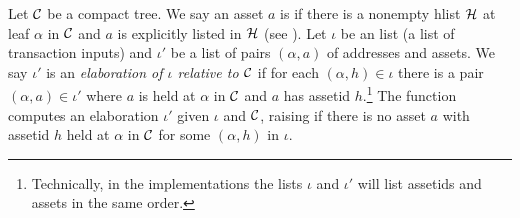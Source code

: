 Let $\mathcal{C}$ be a compact tree.
We say an asset $a$ is {}
if there is a nonempty hlist $\mathcal{H}$ at leaf $\alpha$ in $\mathcal{C}$ and $a$
is explicitly listed in $\mathcal{H}$ (see {}).
Let $\iota$ be an {} list (a list of transaction inputs)
and $\iota'$ be a list of pairs $(\alpha,a)$ of addresses and assets.
We say $\iota'$ is an {\emph{elaboration of $\iota$ relative to $\mathcal{C}$}}
if for each $(\alpha,h) \in\iota$ there is a pair $(\alpha,a) \in\iota'$
where $a$ is held at $\alpha$ in $\mathcal{C}$ and $a$ has assetid $h$.\footnote{Technically, in the implementations the lists $\iota$ and $\iota'$ will list assetids and assets in the same order.}
The function {} 
computes an elaboration $\iota'$ given $\iota$ and $\mathcal{C}$,
raising {} if 
there is no asset $a$ with assetid $h$ held at $\alpha$ in $\mathcal{C}$
for some $(\alpha,h)$ in $\iota$.


